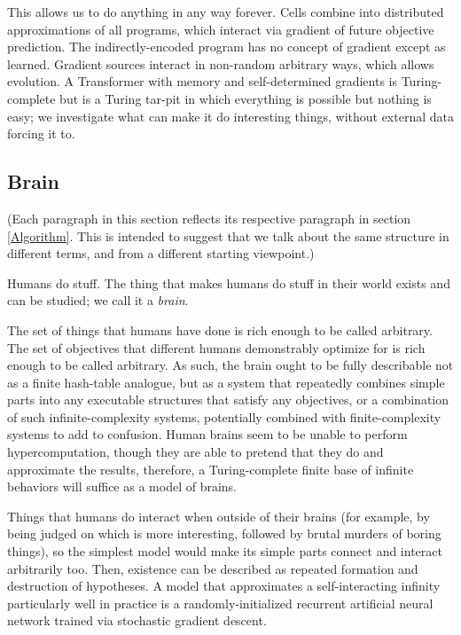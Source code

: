 \documentclass{article}
\begin{document}
This allows us to do anything in any way forever. Cells combine into distributed approximations of all programs, which interact via gradient of future objective prediction. The indirectly-encoded program has no concept of gradient except as learned. Gradient sources interact in non-random arbitrary ways, which allows evolution. A Transformer with memory and self-determined gradients is Turing-complete but is a Turing tar-pit \cite{10.1145/947955.1083808} in which everything is possible but nothing is easy; we investigate what can make it do interesting things, without external data forcing it to.

\subsection{Brain}

(Each paragraph in this section reflects its respective paragraph in section \ref{Algorithm}. This is intended to suggest that we talk about the same structure in different terms, and from a different starting viewpoint.)

Humans do stuff. The thing that makes humans do stuff in their world exists and can be studied; we call it a \textit{brain}.

The set of things that humans have done is rich enough to be called arbitrary. The set of objectives that different humans demonstrably optimize for is rich enough to be called arbitrary. As such, the brain ought to be fully describable not as a finite hash-table analogue, but as a system that repeatedly combines simple parts into any executable structures that satisfy any objectives, or a combination of such infinite-complexity systems, potentially combined with finite-complexity systems to add to confusion. Human brains seem to be unable to perform hypercomputation, though they are able to pretend that they do and approximate the results, therefore, a Turing-complete finite base of infinite behaviors will suffice as a model of brains.

Things that humans do interact when outside of their brains (for example, by being judged on which is more interesting, followed by brutal murders of boring things), so the simplest model would make its simple parts connect and interact arbitrarily too. Then, existence can be described as repeated formation and destruction of hypotheses. A model that approximates a self-interacting infinity particularly well in practice is a randomly-initialized recurrent artificial neural network trained via stochastic gradient descent.
\end{document}
